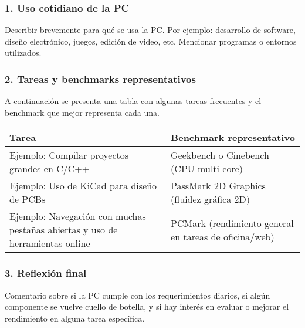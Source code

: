 \subsubsection*{1. Uso cotidiano de la PC}
Describir brevemente para qué se usa la PC. Por ejemplo: desarrollo de software, diseño electrónico, juegos, edición de video, etc. Mencionar programas o entornos utilizados.

\subsubsection*{2. Tareas y benchmarks representativos}

A continuación se presenta una tabla con algunas tareas frecuentes y el benchmark que mejor representa cada una.

\begin{center}
\begin{tabular}{|p{7cm}|p{7cm}|}
\hline
\textbf{Tarea} & \textbf{Benchmark representativo} \\
\hline
Ejemplo: Compilar proyectos grandes en C/C++ & Geekbench o Cinebench (CPU multi-core) \\
\hline
Ejemplo: Uso de KiCad para diseño de PCBs & PassMark 2D Graphics (fluidez gráfica 2D) \\
\hline
Ejemplo: Navegación con muchas pestañas abiertas y uso de herramientas online & PCMark (rendimiento general en tareas de oficina/web) \\
\hline
\end{tabular}
\end{center}

\subsubsection*{3. Reflexión final}
Comentario sobre si la PC cumple con los requerimientos diarios, si algún componente se vuelve cuello de botella, y si hay interés en evaluar o mejorar el rendimiento en alguna tarea específica.
